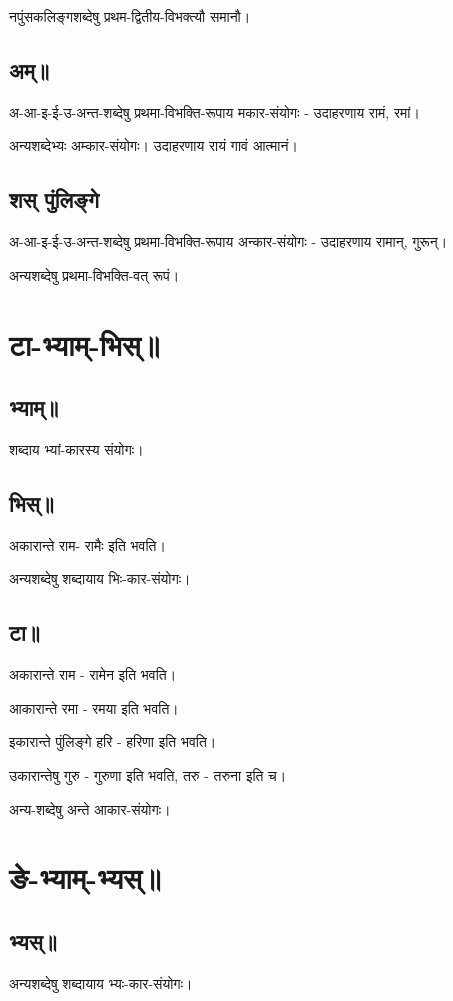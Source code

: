 \documentclass[oneside, article]{memoir}
\begin{document}
नपुंसकलिङ्गशब्देषु प्रथम-द्वितीय-विभक्त्यौ समानौ। 

\subsection{अम्॥}
अ-आ-इ-ई-उ-अन्त-शब्देषु प्रथमा-विभक्ति-रूपाय मकार-संयोगः - उदाहरणाय रामं, रमां।

अन्यशब्देभ्यः अम्कार-संयोगः। उदाहरणाय रायं गावं आत्मानं।

\subsection{शस् पुंलिङ्गे}
अ-आ-इ-ई-उ-अन्त-शब्देषु प्रथमा-विभक्ति-रूपाय अन्कार-संयोगः - उदाहरणाय रामान्, गुरून्।

अन्यशब्देषु प्रथमा-विभक्ति-वत् रूपं।

\section{टा-भ्याम्-भिस्॥}
\subsection{भ्याम्॥}
शब्दाय भ्यां-कारस्य संयोगः।

\subsection{भिस्॥}
अकारान्ते राम- रामैः इति भवति।

अन्यशब्देषु शब्दायाय भिः-कार-संयोगः।

\subsection{टा॥}
अकारान्ते राम - रामेन इति भवति।

आकारान्ते रमा - रमया इति भवति।

इकारान्ते पुंलिङ्गे हरि - हरिणा इति भवति।

उकारान्तेषु गुरु - गुरुणा इति भवति, तरु - तरुना इति च।

अन्य-शब्देषु अन्ते आकार-संयोगः।

\section{ङे-भ्याम्-भ्यस्॥}
\subsection{भ्यस्॥}
अन्यशब्देषु शब्दायाय भ्यः-कार-संयोगः।
\end{document}
